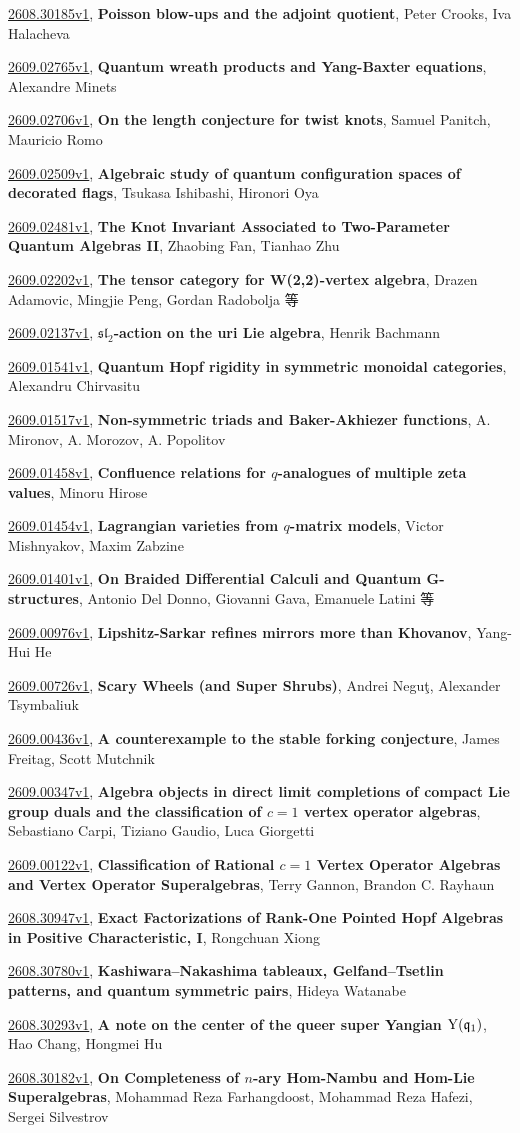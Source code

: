 \documentclass[9pt, a4paper]{article}
\theoremstyle{plain}
\theoremstyle{definition}
\theoremstyle{remark}
\newcommand{\arxiv}[3]{\href{https://arxiv.org/abs/#1}{#1}, \textbf{\textcolor{arxivblue}{#2}}, #3}
\begin{document}
\arxiv{2608.30185v1}{Poisson blow-ups and the adjoint quotient}{Peter Crooks, Iva Halacheva}

\arxiv{2609.02765v1}{Quantum wreath products and Yang-Baxter equations}{Alexandre Minets}

\arxiv{2609.02706v1}{On the length conjecture for twist knots}{Samuel Panitch, Mauricio Romo}

\arxiv{2609.02509v1}{Algebraic study of quantum configuration spaces of decorated flags}{Tsukasa Ishibashi, Hironori Oya}

\arxiv{2609.02481v1}{The Knot Invariant Associated to Two-Parameter Quantum Algebras II}{Zhaobing Fan, Tianhao Zhu}

\arxiv{2609.02202v1}{The tensor category for W(2,2)-vertex algebra}{Drazen Adamovic, Mingjie Peng, Gordan Radobolja 等}

\arxiv{2609.02137v1}{$\mathfrak{sl}_2$-action on the uri Lie algebra}{Henrik Bachmann}

\arxiv{2609.01541v1}{Quantum Hopf rigidity in symmetric monoidal categories}{Alexandru Chirvasitu}

\arxiv{2609.01517v1}{Non-symmetric triads and Baker-Akhiezer functions}{A. Mironov, A. Morozov, A. Popolitov}

\arxiv{2609.01458v1}{Confluence relations for $q$-analogues of multiple zeta values}{Minoru Hirose}

\arxiv{2609.01454v1}{Lagrangian varieties from $q$-matrix models}{Victor Mishnyakov, Maxim Zabzine}

\arxiv{2609.01401v1}{On Braided Differential Calculi and Quantum G-structures}{Antonio Del Donno, Giovanni Gava, Emanuele Latini 等}

\arxiv{2609.00976v1}{Lipshitz-Sarkar refines mirrors more than Khovanov}{Yang-Hui He}

\arxiv{2609.00726v1}{Scary Wheels (and Super Shrubs)}{Andrei Neguţ, Alexander Tsymbaliuk}

\arxiv{2609.00436v1}{A counterexample to the stable forking conjecture}{James Freitag, Scott Mutchnik}

\arxiv{2609.00347v1}{Algebra objects in direct limit completions of compact Lie group duals and the classification of $c=1$ vertex operator algebras}{Sebastiano Carpi, Tiziano Gaudio, Luca Giorgetti}

\arxiv{2609.00122v1}{Classification of Rational $c=1$ Vertex Operator Algebras and Vertex Operator Superalgebras}{Terry Gannon, Brandon C. Rayhaun}

\arxiv{2608.30947v1}{Exact Factorizations of Rank-One Pointed Hopf Algebras in Positive Characteristic, I}{Rongchuan Xiong}

\arxiv{2608.30780v1}{Kashiwara--Nakashima tableaux, Gelfand--Tsetlin patterns, and quantum symmetric pairs}{Hideya Watanabe}

\arxiv{2608.30293v1}{A note on the center of the queer super Yangian ${\rm Y}(\mathfrak{q}_1)$}{Hao Chang, Hongmei Hu}

\arxiv{2608.30182v1}{On Completeness of $n$-ary Hom-Nambu and Hom-Lie Superalgebras}{Mohammad Reza Farhangdoost, Mohammad Reza Hafezi, Sergei Silvestrov}

\end{document}
